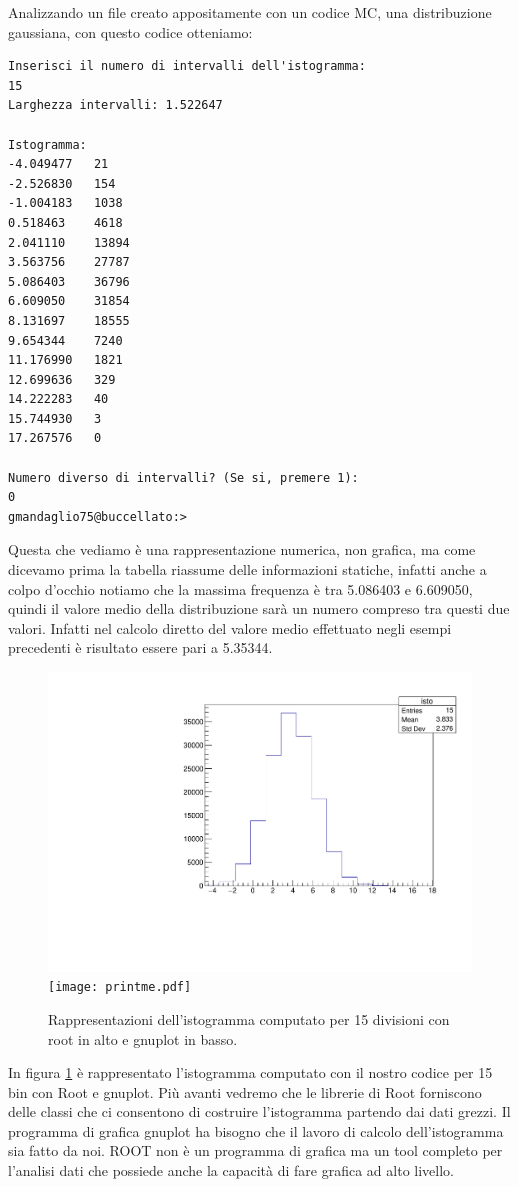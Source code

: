 \documentclass[11pt,fleqn]{book} %
\begin{document}
Analizzando un file creato appositamente con un codice MC, una distribuzione gaussiana, con questo codice otteniamo:

\begin{verbatim}
Inserisci il numero di intervalli dell'istogramma: 
15
Larghezza intervalli: 1.522647

Istogramma:
-4.049477	21
-2.526830	154
-1.004183	1038
0.518463	4618
2.041110	13894
3.563756	27787
5.086403	36796
6.609050	31854
8.131697	18555
9.654344	7240
11.176990	1821
12.699636	329
14.222283	40
15.744930	3
17.267576	0

Numero diverso di intervalli? (Se si, premere 1):
0
gmandaglio75@buccellato:>
\end{verbatim}

Questa che vediamo è una rappresentazione numerica, non grafica, ma come dicevamo prima la tabella riassume delle informazioni statiche, infatti anche a colpo d'occhio notiamo che la massima frequenza è tra  
5.086403 e 6.609050, quindi il valore medio della distribuzione sarà un numero compreso tra questi due valori. Infatti nel calcolo diretto del valore medio effettuato negli esempi precedenti è risultato essere pari a 5.35344.

\begin{figure}[t]
\centering
\includegraphics[scale=0.35]{isto.pdf}\\		
\texttt{[image: printme.pdf]}
\caption{Rappresentazioni dell'istogramma computato per 15 divisioni con root in alto e gnuplot in basso.\label{istos}}
\end{figure}

In figura \ref{istos} è rappresentato l'istogramma computato con il nostro codice per 15 bin con Root e gnuplot. Più avanti vedremo che le librerie di Root forniscono delle classi che ci consentono di costruire l'istogramma partendo dai dati grezzi. Il programma di grafica gnuplot ha bisogno che il lavoro di calcolo dell'istogramma sia fatto da noi. ROOT non è un programma di grafica ma un tool completo per l'analisi dati che possiede anche la capacità di fare grafica ad alto livello.
\end{document}
